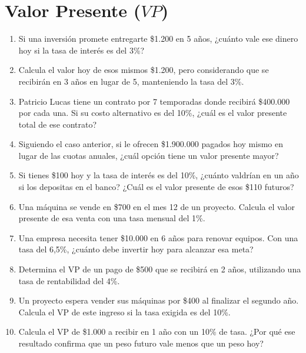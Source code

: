 \documentclass[12pt,a4paper]{article}
\newcommand{\answerspace}{\vspace{4.5cm}}
\newcommand{\lastanswerspace}{\vspace{2cm}}
\begin{document}
\newpage

\section{Valor Presente ($VP$)}

\begin{enumerate}[label=\textbf{\arabic*.}, leftmargin=*, itemsep=0pt]

\item Si una inversión promete entregarte \$1.200 en 5 años, ¿cuánto vale ese dinero hoy si la tasa de interés es del 3\%?
\answerspace

\item Calcula el valor hoy de esos mismos \$1.200, pero considerando que se recibirán en 3 años en lugar de 5, manteniendo la tasa del 3\%.
\answerspace

\item Patricio Lucas tiene un contrato por 7 temporadas donde recibirá \$400.000 por cada una. Si su costo alternativo es del 10\%, ¿cuál es el valor presente total de ese contrato?
\answerspace

\item Siguiendo el caso anterior, si le ofrecen \$1.900.000 pagados hoy mismo en lugar de las cuotas anuales, ¿cuál opción tiene un valor presente mayor?
\answerspace

\item Si tienes \$100 hoy y la tasa de interés es del 10\%, ¿cuánto valdrían en un año si los depositas en el banco? ¿Cuál es el valor presente de esos \$110 futuros?
\answerspace

\item Una máquina se vende en \$700 en el mes 12 de un proyecto. Calcula el valor presente de esa venta con una tasa mensual del 1\%.
\answerspace

\item Una empresa necesita tener \$10.000 en 6 años para renovar equipos. Con una tasa del 6,5\%, ¿cuánto debe invertir hoy para alcanzar esa meta?
\answerspace

\item Determina el VP de un pago de \$500 que se recibirá en 2 años, utilizando una tasa de rentabilidad del 4\%.
\answerspace

\item Un proyecto espera vender sus máquinas por \$400 al finalizar el segundo año. Calcula el VP de este ingreso si la tasa exigida es del 10\%.
\answerspace

\item Calcula el VP de \$1.000 a recibir en 1 año con un 10\% de tasa. ¿Por qué ese resultado confirma que un peso futuro vale menos que un peso hoy?
\lastanswerspace

\end{enumerate}
\end{document}
